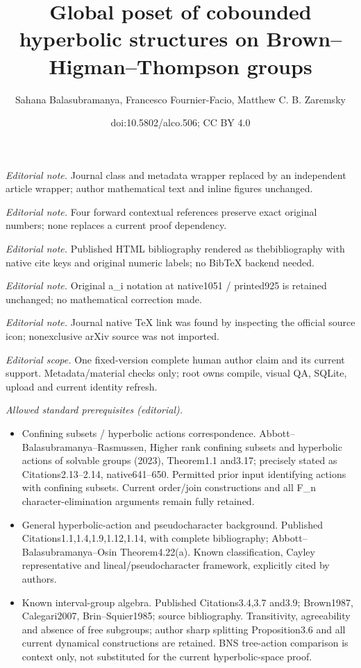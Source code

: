 \documentclass[10pt,a4paper]{article}
\title{Global poset of cobounded hyperbolic structures on Brown–Higman–Thompson groups}
\author{Sahana Balasubramanya, Francesco Fournier-Facio, Matthew C. B. Zaremsky}
\date{doi:10.5802/alco.506; CC BY 4.0}
\theoremstyle{definition}
\theoremstyle{remark}
\theoremstyle{plain}
\begin{document}
\maketitle
\noindent\textit{Editorial note.} Journal class and metadata wrapper replaced by an independent article wrapper; author mathematical text and inline figures unchanged.\par\medskip
\noindent\textit{Editorial note.} Four forward contextual references preserve exact original numbers; none replaces a current proof dependency.\par\medskip
\noindent\textit{Editorial note.} Published HTML bibliography rendered as thebibliography with native cite keys and original numeric labels; no BibTeX backend needed.\par\medskip
\noindent\textit{Editorial note.} Original a\_i notation at native1051 / printed925 is retained unchanged; no mathematical correction made.\par\medskip
\noindent\textit{Editorial note.} Journal native TeX link was found by inspecting the official source icon; nonexclusive arXiv source was not imported.\par\medskip
\noindent\textit{Editorial scope.} One fixed-version complete human author claim and its current support. Metadata/material checks only; root owns compile, visual QA, SQLite, upload and current identity refresh.\par\medskip
\noindent\textit{Allowed standard prerequisites (editorial).}\begin{itemize}
\item Confining subsets / hyperbolic actions correspondence. Abbott–Balasubramanya–Rasmussen, Higher rank confining subsets and hyperbolic actions of solvable groups (2023), Theorem1.1 and3.17; precisely stated as Citations2.13–2.14, native641–650. Permitted prior input identifying actions with confining subsets. Current order/join constructions and all F\_n character-elimination arguments remain fully retained.
\item General hyperbolic-action and pseudocharacter background. Published Citations1.1,1.4,1.9,1.12,1.14, with complete bibliography; Abbott–Balasubramanya–Osin Theorem4.22(a). Known classification, Cayley representative and lineal/pseudocharacter framework, explicitly cited by authors.
\item Known interval-group algebra. Published Citations3.4,3.7 and3.9; Brown1987, Calegari2007, Brin–Squier1985; source bibliography. Transitivity, agreeability and absence of free subgroups; author sharp splitting Proposition3.6 and all current dynamical constructions are retained. BNS tree-action comparison is context only, not substituted for the current hyperbolic-space proof.
\end{itemize}\medskip
\end{document}
